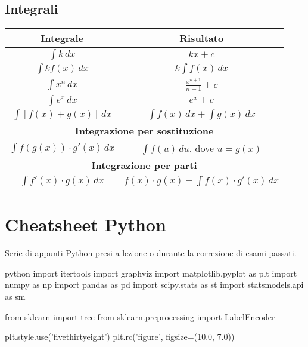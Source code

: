 \documentclass[11pt]{report}
\begin{document}
\section{Integrali}
\begin{center}
	\renewcommand{\arraystretch}{1.5}
    \begin{tabular}{|c|c|}
        \hline
        	\textbf{Integrale} & \textbf{Risultato}\\
        \hline
        	$\int k \,dx$ & $kx + c$\\
        \hline
        	$\int kf(x) \,dx$ & $k \int f(x) \,dx$\\
        \hline
        	$\int x^n \,dx$ & $\frac{x^{n+1}}{n+1} + c$\\
        \hline
        	$\int e^x \,dx$ & $e^x + c$\\
        \hline
        	$\int [f(x) \pm g(x)] \,dx$ & $\int f(x) \,dx \pm \int g(x) \,dx$\\
        \hline
        	\multicolumn{2}{|c|}{\textbf{Integrazione per sostituzione}}\\
        \hline
        	\quad $\int f(g(x)) \cdot g'(x) \,dx$ & $\int f(u) \,du$, dove $u = g(x)$\\
        \hline
        	\multicolumn{2}{|c|}{\textbf{Integrazione per parti}}\\
        \hline
        	\quad $\int f'(x) \cdot g(x) \,dx$ & $f(x) \cdot g(x) - \int f(x) \cdot g'(x) \,dx$\\
        \hline
    \end{tabular}
\end{center}

\chapter{Cheatsheet Python}
Serie di appunti Python presi a lezione o durante la correzione di esami passati.

\begin{mintedbox}{python}
import itertools
import graphviz
import matplotlib.pyplot as plt
import numpy as np
import pandas as pd
import scipy.stats as st
import statsmodels.api as sm

from sklearn import tree
from sklearn.preprocessing import LabelEncoder

plt.style.use('fivethirtyeight')
plt.rc('figure', figsize=(10.0, 7.0))
\end{mintedbox}
\end{document}
